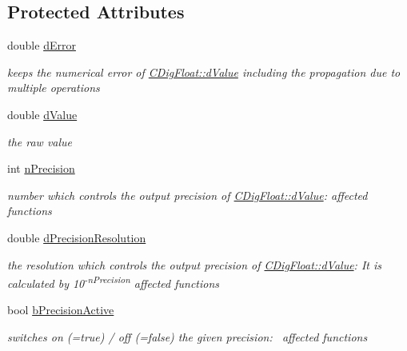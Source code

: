 \subsection*{Protected Attributes}
\begin{DoxyCompactItemize}
\item 
double \hyperlink{classCDigFloat_a25eb3782d1e727ff007a48f8308e3d4d}{d\+Error}
\begin{DoxyCompactList}\small\item\em keeps the numerical error of \hyperlink{classCDigFloat_a4bbe69e30dd4e20527362493aa9aaf96}{C\+Dig\+Float\+::d\+Value} including the propagation due to multiple operations \end{DoxyCompactList}\item 
double \hyperlink{classCDigFloat_a4bbe69e30dd4e20527362493aa9aaf96}{d\+Value}
\begin{DoxyCompactList}\small\item\em the raw value \end{DoxyCompactList}\item 
int \hyperlink{classCDigFloat_ad580654be35246d14c91482581c0bc11}{n\+Precision}
\begin{DoxyCompactList}\small\item\em number which controls the output precision of \hyperlink{classCDigFloat_a4bbe69e30dd4e20527362493aa9aaf96}{C\+Dig\+Float\+::d\+Value}\+: affected functions \end{DoxyCompactList}\item 
double \hyperlink{classCDigFloat_a7f9809fa0b25da57f5c8c18a02b7d1a7}{d\+Precision\+Resolution}
\begin{DoxyCompactList}\small\item\em the resolution which controls the output precision of \hyperlink{classCDigFloat_a4bbe69e30dd4e20527362493aa9aaf96}{C\+Dig\+Float\+::d\+Value}\+: It is calculated by 10\textsuperscript{-\/n\+Precision} affected functions \end{DoxyCompactList}\item 
bool \hyperlink{classCDigFloat_aa1f6ed0312a2aa6ae5ee2abd195adefc}{b\+Precision\+Active}
\begin{DoxyCompactList}\small\item\em switches on (=true) / off (=false) the given precision\+:~\newline
 affected functions \end{DoxyCompactList}\end{DoxyCompactItemize}
